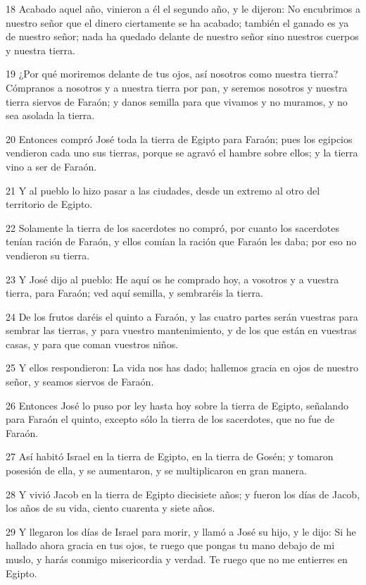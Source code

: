18 Acabado aquel año, vinieron a él el segundo año, y le dijeron: No encubrimos a nuestro señor que el dinero ciertamente se ha acabado; también el ganado es ya de nuestro señor; nada ha quedado delante de nuestro señor sino nuestros cuerpos y nuestra tierra.

19 ¿Por qué moriremos delante de tus ojos, así nosotros como nuestra tierra? Cómpranos a nosotros y a nuestra tierra por pan, y seremos nosotros y nuestra tierra siervos de Faraón; y danos semilla para que vivamos y no muramos, y no sea asolada la tierra.

20 Entonces compró José toda la tierra de Egipto para Faraón; pues los egipcios vendieron cada uno sus tierras, porque se agravó el hambre sobre ellos; y la tierra vino a ser de Faraón.

21 Y al pueblo lo hizo pasar a las ciudades, desde un extremo al otro del territorio de Egipto.

22 Solamente la tierra de los sacerdotes no compró, por cuanto los sacerdotes tenían ración de Faraón, y ellos comían la ración que Faraón les daba; por eso no vendieron su tierra.

23 Y José dijo al pueblo: He aquí os he comprado hoy, a vosotros y a vuestra tierra, para Faraón; ved aquí semilla, y sembraréis la tierra.

24 De los frutos daréis el quinto a Faraón, y las cuatro partes serán vuestras para sembrar las tierras, y para vuestro mantenimiento, y de los que están en vuestras casas, y para que coman vuestros niños.

25 Y ellos respondieron: La vida nos has dado; hallemos gracia en ojos de nuestro señor, y seamos siervos de Faraón.

26 Entonces José lo puso por ley hasta hoy sobre la tierra de Egipto, señalando para Faraón el quinto, excepto sólo la tierra de los sacerdotes, que no fue de Faraón.

27 Así habitó Israel en la tierra de Egipto, en la tierra de Gosén; y tomaron posesión de ella, y se aumentaron, y se multiplicaron en gran manera.

28 Y vivió Jacob en la tierra de Egipto diecisiete años; y fueron los días de Jacob, los años de su vida, ciento cuarenta y siete años.

29 Y llegaron los días de Israel para morir, y llamó a José su hijo, y le dijo: Si he hallado ahora gracia en tus ojos, te ruego que pongas tu mano debajo de mi muslo, y harás conmigo misericordia y verdad. Te ruego que no me entierres en Egipto.

